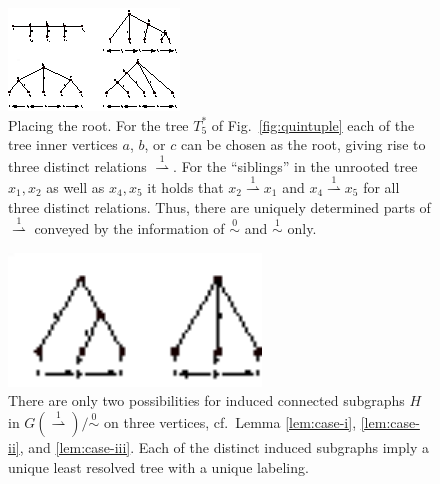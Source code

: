\documentclass[smallextended]{svjour3}
\newcommand{\Ro}{\mathrel{\overset{0}{\sim}}}
\newcommand{\Rl}{\mathrel{\overset{1}{\sim}}}
\newcommand{\Rld}{\mathrel{\overset{1}{\rightharpoonup}}}
\begin{document}
\begin{figure}[t]
\begin{center}
\includegraphics[width=\textwidth]{fig4.eps}
\end{center}
\caption{Placing the root. For the tree $T_5^*$ of Fig.\
  \ref{fig:quintuple} each of the tree inner vertices $a$, $b$, or $c$ can
  be chosen as the root, giving rise to three distinct relations $\Rld$.
  For the ``siblings'' in the unrooted tree $x_1,x_2$ as well as $x_4,x_5$
  it holds that $x_2\Rld x_1$ and $x_4\Rld x_5$ for all three distinct
  relations.  Thus, there are uniquely determined parts of $\Rld$ conveyed
  by the information of $\Ro$ and $\Rl$ only.}
\label{fig:root}
\end{figure} 
\begin{figure}[t]
\begin{center}
\includegraphics[width=0.6\textwidth]{fig5.eps}
\end{center}
\caption{There are only two possibilities for induced connected subgraphs
  $H$ in $G(\Rld)/\Ro$ on three vertices, cf.\ Lemma \ref{lem:case-i},
  \ref{lem:case-ii}, and \ref{lem:case-iii}.  Each of the distinct induced
  subgraphs imply a unique least resolved tree with a unique labeling.}
\label{fig:2cases}
\end{figure} 
\end{document}
